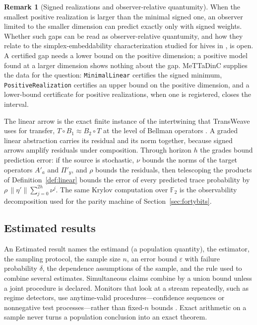 \documentclass[11pt]{article}
\newcommand{\code}[1]{\texttt{#1}}
\newcommand{\F}{\mathbb{F}}
\theoremstyle{definition}
\newtheorem{remark}[definition]{Remark}
\theoremstyle{plain}
\begin{document}
\begin{remark}[Signed realizations and observer-relative quantumity]
When the smallest positive realization is larger than the minimal signed one, an observer limited
to the smaller dimension can predict exactly only with signed weights. Whether such gaps can be
read as observer-relative quantumity, and how they relate to the simplex-embeddability
characterization studied for hives in \cite{quantumity}, is open. A certified gap needs a lower
bound on the positive dimension; a positive model found at a larger dimension shows nothing about
the gap. MeTTaDinC supplies the data for the question: \code{MinimalLinear} certifies the signed
minimum, \code{PositiveRealization} certifies an upper bound on the positive dimension, and a
lower-bound certificate for positive realizations, when one is registered, closes the interval.
\end{remark}

The linear arrow is the exact finite instance of the intertwining that TransWeave uses for
transfer, $T\circ B_1\approx B_2\circ T$ at the level of Bellman operators
\cite{transweave,transferhives}. A graded linear abstraction carries its residual and its norm
together, because signed arrows amplify residuals under composition. Through horizon $h$ the
grades bound prediction error: if the source is stochastic, $\nu$ bounds the norms of the target
operators $A'_a$ and $\Pi'_y$, and $\rho$ bounds the residuals, then telescoping the products of
Definition~\ref{def:linear} bounds the error of every predicted trace probability by
$\rho\,\|\eta'\|\sum_{j=0}^{2h}\nu^{j}$. The same Krylov computation over $\F_2$ is the
observability decomposition used for the parity machine of Section~\ref{sec:fortybits}.

\subsection{Estimated results}\label{sec:estimated}

An Estimated result names the estimand (a population quantity), the estimator, the sampling
protocol, the sample size $n$, an error bound $\varepsilon$ with failure probability $\delta$, the
dependence assumptions of the sample, and the rule used to combine several estimates. Simultaneous
claims combine by a union bound unless a joint procedure is declared. Monitors that look at a
stream repeatedly, such as regime detectors, use anytime-valid procedures---confidence sequences or
nonnegative test processes---rather than fixed-$n$ bounds \cite{howard,ramdas,regimes}. Exact
arithmetic on a sample never turns a population conclusion into an exact theorem.
\end{document}
